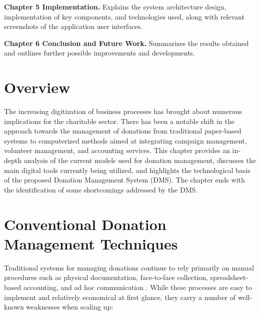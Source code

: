 \documentclass{thesis-library}
\begin{document}
\textbf{Chapter 5 Implementation.} Explains the system architecture design, implementation of key components, and technologies used, along with relevant screenshots of the application user interfaces.

\textbf{Chapter 6 Conclusion and Future Work.} Summarizes the results obtained and outlines further possible improvements and developments.


\section{Overview}
The increasing digitization of business processes has brought about numerous implications for the charitable sector. There has been a notable shift in the approach towards the management of donations from traditional paper-based systems to computerized methods aimed at integrating campaign management, volunteer management, and accounting services. This chapter provides an in-depth analysis of the current models used for donation management, discusses the main digital tools currently being utilized, and highlights the technological basis of the proposed Donation Management System (DMS). The chapter ends with the identification of some shortcomings addressed by the DMS.

\section{Conventional Donation Management Techniques}

Traditional systems for managing donations continue to rely primarily on manual procedures such as physical documentation, face-to-face collection, spreadsheet-based accounting, and ad hoc communication \cite{robinson2019digital,kalinda2022university}. While these processes are easy to implement and relatively economical at first glance, they carry a number of well-known weaknesses when scaling up:
\end{document}
